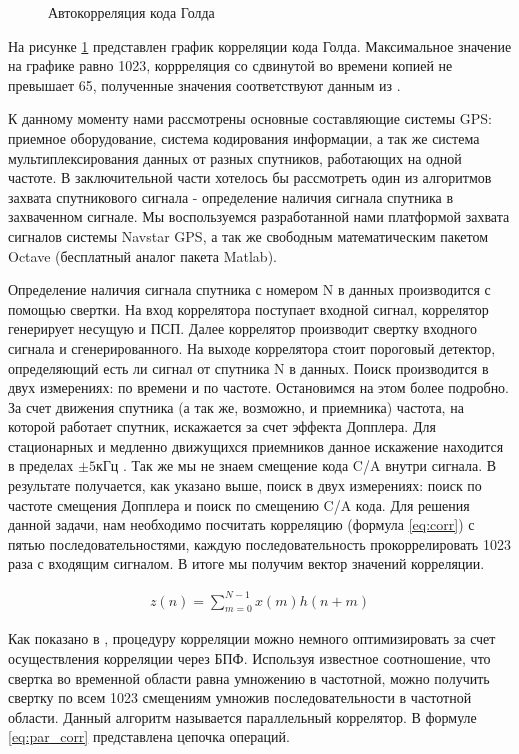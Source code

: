 \documentclass[a4paper,12pt]{article}
\numberwithin{table}{section}
\begin{document}
\begin{figure}[h]
\begin{center}
\end{center}
\caption{Автокорреляция кода Голда}
\label{pic:gold}
\end{figure}
На рисунке \ref{pic:gold} представлен график корреляции кода Голда. Максимальное значение на графике равно 1023, коррреляция 
со сдвинутой во времени копией не превышает 65, полученные значения соответствуют данным из \cite{gold-ieee}.

К данному моменту нами рассмотрены основные составляющие системы GPS: приемное оборудование, система кодирования информации,
а так же система мультиплексирования данных от разных спутников, работающих на одной частоте. В заключительной части хотелось
бы рассмотреть один из алгоритмов захвата спутникового сигнала - определение наличия сигнала спутника 
в захваченном сигнале. Мы воспользуемся разработанной нами платформой захвата сигналов системы Navstar GPS, а так же
свободным математическим пакетом Octave (бесплатный аналог пакета Matlab).

Определение наличия сигнала спутника с номером N в данных производится с помощью свертки. На вход коррелятора поступает входной
сигнал, коррелятор генерирует несущую и ПСП. Далее коррелятор производит свертку входного сигнала и сгенерированного. 
На выходе коррелятора стоит пороговый детектор, определяющий есть ли сигнал от спутника N в данных. Поиск производится в 
двух измерениях: по времени и по частоте. Остановимся на этом более подробно. За счет движения спутника (а так же, возможно,
и приемника) частота, на которой работает спутник, искажается за счет эффекта Допплера. Для стационарных и медленно движущихся
приемников данное искажение находится в  пределах ${\pm{5 \mbox{кГц}}}$ \cite{tsui}. Так же мы не знаем смещение кода C/A
внутри сигнала. В результате получается, как указано выше, поиск в двух измерениях: поиск по частоте смещения Допплера и
поиск по смещению C/A кода. Для решения данной задачи, нам необходимо посчитать корреляцию (формула \ref{eq:corr}) с пятью последовательностями,
каждую последовательность прокоррелировать 1023 раза с входящим сигналом. В итоге мы получим вектор значений корреляции.

\begin{eqnarray}
	z(n) = \sum_{m=0}^{N-1}{x(m)h(n+m)}
\label{eq:corr}
\end{eqnarray}

Как показано в \cite{oppenheim, tsui}, процедуру корреляции можно немного оптимизировать за счет осуществления корреляции через
БПФ. Используя известное соотношение, что свертка во временной области равна умножению в частотной, можно получить свертку по
всем 1023 смещениям умножив последовательности в частотной области. Данный алгоритм называется параллельный коррелятор.
В формуле \ref{eq:par_corr} представлена цепочка операций.
\end{document}
